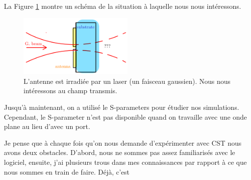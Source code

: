 La Figure \ref{fig:onde_plane} montre un schéma de la situation
à laquelle nous nous intéressons.

\begin{figure}[h!]
    \centering
    \includegraphics[width=0.5\textwidth]{texfigures/onde_plane.png}
    \caption{\label{fig:onde_plane} L'antenne est irradiée par un laser (un faisceau gaussien). Nous nous intéressons au champ transmis.}
\end{figure}


Jusqu'à maintenant, on a utilisé le S-parameters pour étudier nos
simulations. Cependant, le S-parameter n'est pas disponible
quand on travaille avec une onde plane au lieu d'avec un port.


Je pense que à chaque fois qu'on nous
demande d'expérimenter avec CST nous avons deux obstacles.
D'abord, nous ne sommes pas assez familiarisés avec le logiciel,
ensuite, j'ai plusieurs trous dans mes connaissances par rapport
à ce que nous sommes en train de faire.  Déjà, c'est 

